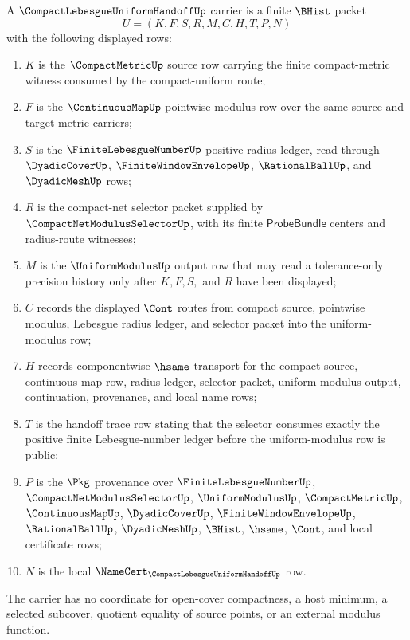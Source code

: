 \begin{definition}
\label{def:compact-lebesgue-uniform-handoff-carrier}
A $\CompactLebesgueUniformHandoffUp$ carrier is a finite $\BHist$ packet
$$
U=(K,F,S,R,M,C,H,T,P,N)
$$
with the following displayed rows:
\begin{enumerate}
\item $K$ is the $\CompactMetricUp$ source row carrying the finite compact-metric witness consumed by the compact-uniform route;
\item $F$ is the $\ContinuousMapUp$ pointwise-modulus row over the same source and target metric carriers;
\item $S$ is the $\FiniteLebesgueNumberUp$ positive radius ledger, read through $\DyadicCoverUp$, $\FiniteWindowEnvelopeUp$, $\RationalBallUp$, and $\DyadicMeshUp$ rows;
\item $R$ is the compact-net selector packet supplied by $\CompactNetModulusSelectorUp$, with its finite $\mathsf{ProbeBundle}$ centers and radius-route witnesses;
\item $M$ is the $\UniformModulusUp$ output row that may read a tolerance-only precision history only after $K,F,S,$ and $R$ have been displayed;
\item $C$ records the displayed $\Cont$ routes from compact source, pointwise modulus, Lebesgue radius ledger, and selector packet into the uniform-modulus row;
\item $H$ records componentwise $\hsame$ transport for the compact source, continuous-map row, radius ledger, selector packet, uniform-modulus output, continuation, provenance, and local name rows;
\item $T$ is the handoff trace row stating that the selector consumes exactly the positive finite Lebesgue-number ledger before the uniform-modulus row is public;
\item $P$ is the $\Pkg$ provenance over $\FiniteLebesgueNumberUp$, $\CompactNetModulusSelectorUp$, $\UniformModulusUp$, $\CompactMetricUp$, $\ContinuousMapUp$, $\DyadicCoverUp$, $\FiniteWindowEnvelopeUp$, $\RationalBallUp$, $\DyadicMeshUp$, $\BHist$, $\hsame$, $\Cont$, and local certificate rows;
\item $N$ is the local $\NameCert_{\CompactLebesgueUniformHandoffUp}$ row.
\end{enumerate}
The carrier has no coordinate for open-cover compactness, a host minimum, a selected subcover, quotient equality of source points, or an external modulus function.
\end{definition}

